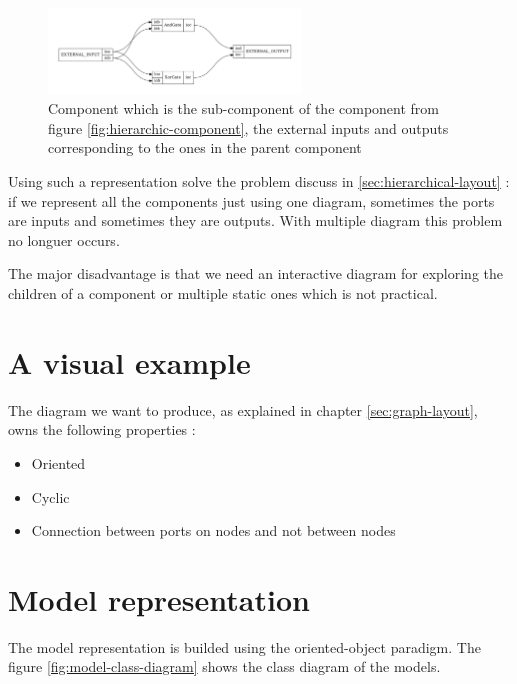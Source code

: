 \begin{figure}[H]
  \centering
  \includegraphics[width=0.6\textwidth]{img/AndXorGate.pdf}
  \caption[SpinalHDL Component inside an another]{Component which is the
    sub-component of the component from figure \ref{fig:hierarchic-component},
    the external inputs and outputs corresponding to the ones in the parent component}
  \label{fig:and-xor-gate}
\end{figure}

Using such a representation solve the problem discuss in
\ref{sec:hierarchical-layout} : if we represent all the components just using
one diagram, sometimes the ports are inputs and sometimes they are outputs. With
multiple diagram this problem no longuer occurs.

The major disadvantage is that we need an interactive diagram for exploring
the children of a component or multiple static ones which is not practical.

\section{A visual example}

The diagram we want to produce, as explained in chapter \ref{sec:graph-layout}, owns the following properties :
\begin{itemize}
  \item Oriented
  \item Cyclic
  \item Connection between ports on nodes and not between nodes
\end{itemize}

\section{Model representation}
\label{sec:model-representation} 

The model representation is builded using the oriented-object paradigm. The
figure \ref{fig:model-class-diagram} shows the class diagram of the models.

